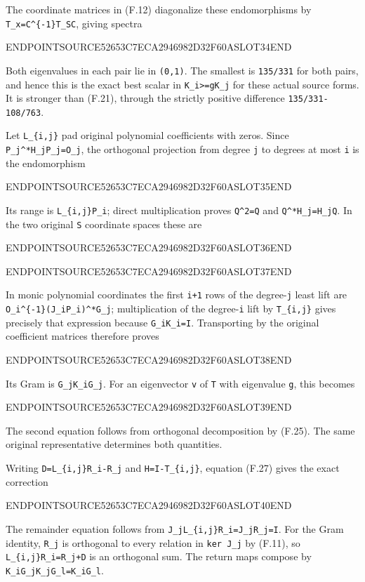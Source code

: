 The coordinate matrices in (F.12) diagonalize these endomorphisms by \texttt{T\_x=C\^{}\{-1\}T\_SC}, giving spectra

ENDPOINTSOURCE52653C7ECA2946982D32F60ASLOT34END

Both eigenvalues in each pair lie in \texttt{(0,1)}. The smallest is \texttt{135/331} for both pairs, and hence this is the exact best scalar in \texttt{K\_i\textgreater{}=gK\_j} for these actual source forms. It is stronger than (F.21), through the strictly positive difference \texttt{135/331-108/763}.

Let \texttt{L\_\{i,j\}} pad original polynomial coefficients with zeros. Since \texttt{P\_j\^{}*H\_jP\_j=O\_j}, the orthogonal projection from degree \texttt{j} to degrees at most \texttt{i} is the endomorphism

ENDPOINTSOURCE52653C7ECA2946982D32F60ASLOT35END

Its range is \texttt{L\_\{i,j\}P\_i}; direct multiplication proves \texttt{Q\^{}2=Q} and \texttt{Q\^{}*H\_j=H\_jQ}. In the two original \texttt{S} coordinate spaces these are

ENDPOINTSOURCE52653C7ECA2946982D32F60ASLOT36END

ENDPOINTSOURCE52653C7ECA2946982D32F60ASLOT37END

In monic polynomial coordinates the first \texttt{i+1} rows of the degree-\texttt{j} least lift are \texttt{O\_i\^{}\{-1\}(J\_iP\_i)\^{}*G\_j}; multiplication of the degree-\texttt{i} lift by \texttt{T\_\{i,j\}} gives precisely that expression because \texttt{G\_iK\_i=I}. Transporting by the original coefficient matrices therefore proves

ENDPOINTSOURCE52653C7ECA2946982D32F60ASLOT38END

Its Gram is \texttt{G\_jK\_iG\_j}. For an eigenvector \texttt{v} of \texttt{T} with eigenvalue \texttt{g}, this becomes

ENDPOINTSOURCE52653C7ECA2946982D32F60ASLOT39END

The second equation follows from orthogonal decomposition by (F.25). The same original representative determines both quantities.

Writing \texttt{D=L\_\{i,j\}R\_i-R\_j} and \texttt{H=I-T\_\{i,j\}}, equation (F.27) gives the exact correction

ENDPOINTSOURCE52653C7ECA2946982D32F60ASLOT40END

The remainder equation follows from \texttt{J\_jL\_\{i,j\}R\_i=J\_jR\_j=I}. For the Gram identity, \texttt{R\_j} is orthogonal to every relation in \texttt{ker\ J\_j} by (F.11), so \texttt{L\_\{i,j\}R\_i=R\_j+D} is an orthogonal sum. The return maps compose by \texttt{K\_iG\_jK\_jG\_l=K\_iG\_l}.

